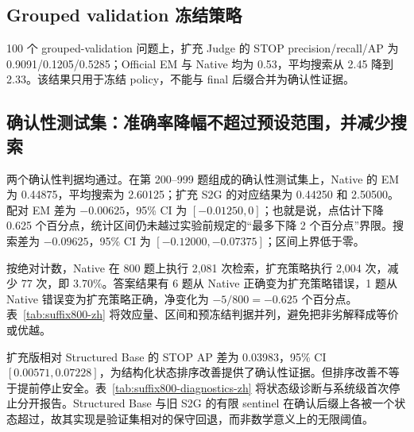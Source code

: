 \documentclass[UTF8,fontset=fandol,11pt,a4paper]{ctexart}
\begin{document}
\subsection{Grouped validation 冻结策略}

100 个 grouped-validation 问题上，扩充 Judge 的 STOP precision/recall/AP 为 0.9091/0.1205/0.5285；Official EM 与 Native 均为 0.53，平均搜索从 2.45 降到 2.33。该结果只用于冻结 policy，不能与 final 后缀合并为确认性证据。

\subsection{确认性测试集：准确率降幅不超过预设范围，并减少搜索}

两个确认性判据均通过。在第 200--999 题组成的确认性测试集上，Native 的 EM 为 0.44875，平均搜索为 2.60125；扩充 S2G 的对应结果为 0.44250 和 2.50500。配对 EM 差为 $-0.00625$，95\% CI 为 $[-0.01250,0]$；也就是说，点估计下降 0.625 个百分点，统计区间仍未越过实验前规定的“最多下降 2 个百分点”界限。搜索差为 $-0.09625$，95\% CI 为 $[-0.12000,-0.07375]$；区间上界低于零。

按绝对计数，Native 在 800 题上执行 2,081 次检索，扩充策略执行 2,004 次，减少 77 次，即 3.70\%。答案结果有 6 题从 Native 正确变为扩充策略错误，1 题从 Native 错误变为扩充策略正确，净变化为 $-5/800=-0.625$ 个百分点。表~\ref{tab:suffix800-zh} 将效应量、区间和预冻结判据并列，避免把非劣解释成等价或优越。

\begin{table}[H]
\centering
\small
\caption{确认性测试集主要结果。差值定义为扩充 S2G 减 Native；两个预冻结判据均通过。}
\label{tab:suffix800-zh}
\end{table}

扩充版相对 Structured Base 的 STOP AP 差为 0.03983，95\% CI $[0.00571,0.07228]$，为结构化状态排序改善提供了确认性证据。但排序改善不等于提前停止安全。表~\ref{tab:suffix800-diagnostics-zh} 将状态级诊断与系统级首次停止分开报告。Structured Base 与旧 S2G 的有限 sentinel 在确认后缀上各被一个状态超过，故其实现是验证集相对的保守回退，而非数学意义上的无限阈值。
\end{document}
